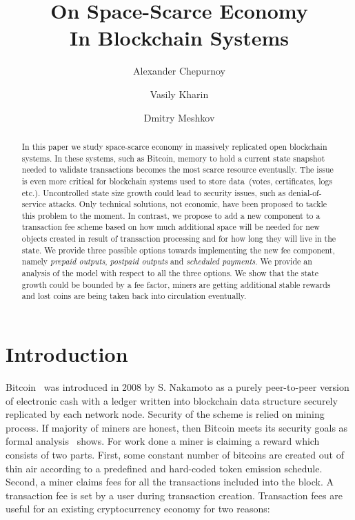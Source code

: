 \documentclass[]{llncs}   %
\begin{document}
\title{On Space-Scarce Economy\\ In Blockchain Systems}

\author{Alexander Chepurnoy \and Vasily Kharin \and Dmitry Meshkov}
\maketitle

\begin{abstract}

In this paper we study space-scarce economy in massively replicated open
blockchain systems. In these systems, such as Bitcoin, memory to hold a current
state snapshot needed to validate transactions becomes the most scarce resource
eventually. The issue is even more critical for blockchain systems used to store
data~(votes, certificates, logs etc.). Uncontrolled state size growth could lead
to security issues, such as denial-of-service attacks. Only technical solutions,
not economic, have been proposed to tackle this problem to the moment. In
contrast, we propose to add a new component to a transaction fee scheme based on
how much additional space will be needed for new objects created in result of
transaction processing and for how long they will live in the state. We provide
three possible options towards implementing the new fee component, namely
\textit{prepaid outputs}, \textit{postpaid outputs} and \textit{scheduled
payments}. We provide an analysis of the model with respect to all the three
options. We show that the state growth could be bounded by a fee factor, miners
are getting additional stable rewards and lost coins are being taken back into
circulation eventually.    

\end{abstract}

\section{Introduction}

Bitcoin~\cite{Nakamoto2008} was introduced in 2008 by S. Nakamoto as a purely
peer-to-peer version of electronic cash with a ledger written into blockchain
data structure securely replicated by each network node. Security of the scheme
is relied on mining process. If majority of miners are honest, then Bitcoin
meets its security goals as formal analysis~\cite{Garay2015} shows. For work
done a miner is claiming a reward which consists of two parts. First, some
constant number of bitcoins are created out of thin air according to a
predefined and hard-coded token emission schedule. Second, a miner claims fees
for all the transactions included into the block. A transaction fee is set by a
user during transaction creation. Transaction fees are useful for an existing
cryptocurrency economy for two reasons:
\end{document}
